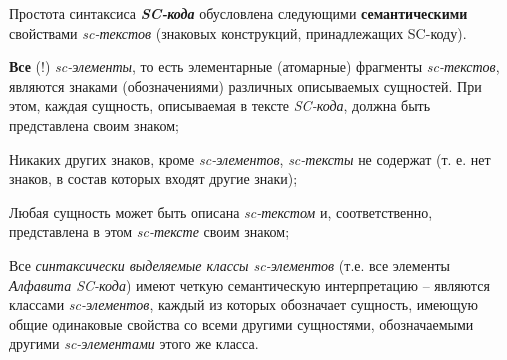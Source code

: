 \begin{SCn}
{Простота синтаксиса \textit{\textbf{SC-кода}} обусловлена следующими \textbf{семантическими} свойствами \textit{sc-текстов} (знаковых конструкций, принадлежащих SC-коду).

\begin{scnitemize}
    \item \textbf{Все} (!) \textit{sc-элементы}, то есть элементарные (атомарные) фрагменты \textit{sc-текстов}, являются знаками (обозначениями) различных описываемых сущностей. При этом, каждая сущность, описываемая в тексте \textit{SC-кода}, должна быть представлена своим знаком;
    \item Никаких других знаков, кроме \textit{sc-элементов}, \textit{sc-тексты} не содержат (т. е. нет знаков, в состав которых входят другие знаки); 
    \item Любая сущность может быть описана \textit{sc-текстом} и, соответственно, представлена в этом \textit{sc-тексте} своим знаком;
    \item Все \textit{синтаксически выделяемые классы sc-элементов} (т.е. все элементы \textit{Алфавита SC-кода}) имеют четкую семантическую интерпретацию -- являются классами \textit{sc-элементов}, каждый из которых обозначает сущность, имеющую общие одинаковые свойства со всеми другими сущностями, обозначаемыми другими \textit{sc-элементами} этого же класса.
\end{scnitemize}}

\scnendstruct

\end{SCn}
